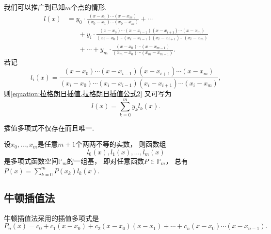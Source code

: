 我们可以推广到已知\(m\)个点的情形.
\begin{equation}\label{equation:拉格朗日插值.拉格朗日插值公式2}
	\begin{aligned}
		l(x)
		&= y_0 \cdot \frac{(x-x_1)\dotsm(x-x_m)}{(x_0-x_1)\dotsm(x_0-x_m)}
		+ \dotsb \\
		&\hspace{20pt}
		+ y_i \cdot \frac{(x-x_0)\dotsm(x-x_{i-1})(x-x_{i+1})\dotsm(x-x_m)}
		{(x_i-x_0)\dotsm(x_i-x_{i-1})(x_i-x_{i+1})\dotsm(x_i-x_m)} \\
		&\hspace{20pt}
		+ \dotsb
		+ y_m \cdot \frac{(x-x_0)\dotsm(x-x_{m-1})}{(x_m-x_0)\dotsm(x_m-x_{m-1})}.
	\end{aligned}
\end{equation}
若记\begin{equation}
	l_i(x) = \frac{(x-x_0)\dotsm(x-x_{i-1})(x-x_{i+1})\dotsm(x-x_m)}
	{(x_i-x_0)\dotsm(x_i-x_{i-1})(x_i-x_{i+1})\dotsm(x_i-x_m)},
\end{equation}
则\cref{equation:拉格朗日插值.拉格朗日插值公式2} 又可写为\begin{equation}
	l(x) = \sum_{k=0}^m y_k l_k(x).
\end{equation}

插值多项式不仅存在而且唯一.
\begin{theorem}
设\(x_0,\dotsc,x_m\)是任意\(m+1\)个两两不等的实数，
则函数组\begin{equation*}
	l_0(x), l_1(x), \dotsc, l_m(x)
\end{equation*}是多项式函数空间\(\mathbb{P}_m\)的一组基，
即对任意函数\(P\in\mathbb{P}_m\)，
总有\(P(x) = \sum_{k=0}^m P(x_k) l_k(x)\).
\end{theorem}

\subsection{牛顿插值法}
牛顿插值法采用的插值多项式是\begin{equation*}
	P_n(x) = c_0 + c_1 (x-x_0) + c_2 (x-x_0)(x-x_1)
	+ \dotsb + c_n (x-x_0)\dotsm(x-x_{n-1}).
\end{equation*}

